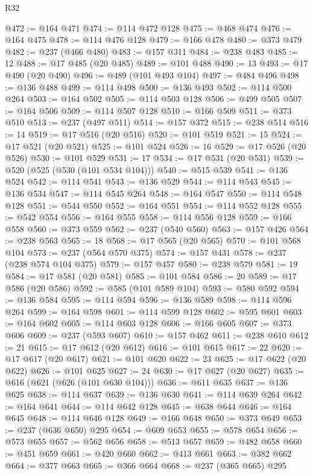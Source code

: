 \begin{lexlean}{R32}
\begin{coremodule}
@472 := @164 @471
@474 := @114 @472 @128
@475 := @468 @474
@476 := @164 @475
@478 := @114 @476 @128
@479 := @166 @478
@480 := @373 @479
@482 := @237 (@466 @480)
@483 := @157 @311
@484 := @238 @483
@485 := 12
@488 := @17 @485 (@20 @485)
@489 := @101 @488
@490 := 13
@493 := @17 @490 (@20 @490)
@496 := @489 (@101 @493 @104)
@497 := @484 @496
@498 := @136 @488
@499 := @114 @498
@500 := @136 @493
@502 := @114 @500 @264
@503 := @164 @502
@505 := @114 @503 @128
@506 := @499 @505
@507 := @164 @506
@509 := @114 @507 @128
@510 := @166 @509
@511 := @373 @510
@513 := @237 (@497 @511)
@514 := @157 @372
@515 := @238 @514
@516 := 14
@519 := @17 @516 (@20 @516)
@520 := @101 @519
@521 := 15
@524 := @17 @521 (@20 @521)
@525 := @101 @524
@526 := 16
@529 := @17 @526 (@20 @526)
@530 := @101 @529
@531 := 17
@534 := @17 @531 (@20 @531)
@539 := @520 (@525 (@530 (@101 @534 @104)))
@540 := @515 @539
@541 := @136 @524
@542 := @114 @541
@543 := @136 @529
@544 := @114 @543
@545 := @136 @534
@547 := @114 @545 @264
@548 := @164 @547
@550 := @114 @548 @128
@551 := @544 @550
@552 := @164 @551
@554 := @114 @552 @128
@555 := @542 @554
@556 := @164 @555
@558 := @114 @556 @128
@559 := @166 @558
@560 := @373 @559
@562 := @237 (@540 @560)
@563 := @157 @426
@564 := @238 @563
@565 := 18
@568 := @17 @565 (@20 @565)
@570 := @101 @568 @104
@573 := @237 (@564 @570 @375)
@574 := @157 @431
@578 := @237 (@238 @574 @104 @375)
@579 := @157 @457
@580 := @238 @579
@581 := 19
@584 := @17 @581 (@20 @581)
@585 := @101 @584
@586 := 20
@589 := @17 @586 (@20 @586)
@592 := @585 (@101 @589 @104)
@593 := @580 @592
@594 := @136 @584
@595 := @114 @594
@596 := @136 @589
@598 := @114 @596 @264
@599 := @164 @598
@601 := @114 @599 @128
@602 := @595 @601
@603 := @164 @602
@605 := @114 @603 @128
@606 := @166 @605
@607 := @373 @606
@609 := @237 (@593 @607)
@610 := @157 @462
@611 := @238 @610
@612 := 21
@615 := @17 @612 (@20 @612)
@616 := @101 @615
@617 := 22
@620 := @17 @617 (@20 @617)
@621 := @101 @620
@622 := 23
@625 := @17 @622 (@20 @622)
@626 := @101 @625
@627 := 24
@630 := @17 @627 (@20 @627)
@635 := @616 (@621 (@626 (@101 @630 @104)))
@636 := @611 @635
@637 := @136 @625
@638 := @114 @637
@639 := @136 @630
@641 := @114 @639 @264
@642 := @164 @641
@644 := @114 @642 @128
@645 := @638 @644
@646 := @164 @645
@648 := @114 @646 @128
@649 := @166 @648
@650 := @373 @649
@653 := @237 (@636 @650) @295
@654 := @609 @653
@655 := @578 @654
@656 := @573 @655
@657 := @562 @656
@658 := @513 @657
@659 := @482 @658
@660 := @451 @659
@661 := @420 @660
@662 := @413 @661
@663 := @382 @662
@664 := @377 @663
@665 := @366 @664
@668 := @237 (@365 @665) @295

\end{coremodule}
\end{lexlean}
